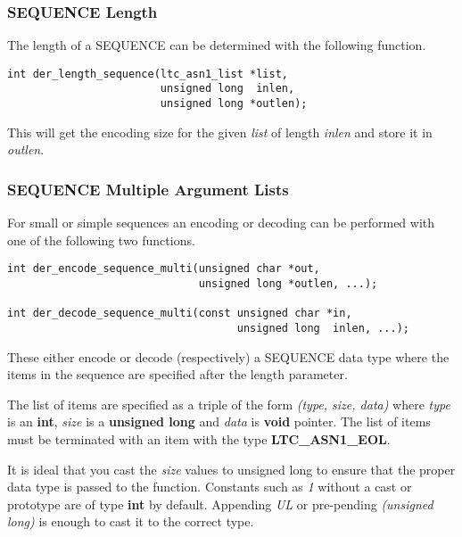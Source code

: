 \documentclass[synpaper]{book}
\begin{document}
\subsubsection{SEQUENCE Length}

The length of a SEQUENCE can be determined with the following function.

\begin{verbatim}
int der_length_sequence(ltc_asn1_list *list,
                        unsigned long  inlen,
                        unsigned long *outlen);
\end{verbatim}

This will get the encoding size for the given \textit{list} of length \textit{inlen} and store it in \textit{outlen}.

\subsubsection{SEQUENCE Multiple Argument Lists}

For small or simple sequences an encoding or decoding can be performed with one of the following two functions.


\begin{verbatim}
int der_encode_sequence_multi(unsigned char *out,
                              unsigned long *outlen, ...);

int der_decode_sequence_multi(const unsigned char *in,
                                    unsigned long  inlen, ...);
\end{verbatim}

These either encode or decode (respectively) a SEQUENCE data type where the items in the sequence are specified after the length parameter.

The list of items are specified as a triple of the form \textit{(type, size, data)}  where \textit{type} is an \textbf{int}, \textit{size} is a \textbf{unsigned long}
and \textit{data} is \textbf{void} pointer.  The list of items must be terminated with an item with the type \textbf{LTC\_ASN1\_EOL}.

It is ideal that you cast the \textit{size} values to unsigned long to ensure that the proper data type is passed to the function.  Constants such as \textit{1} without
a cast or prototype are of type \textbf{int} by default.  Appending \textit{UL} or pre-pending \textit{(unsigned long)} is enough to cast it to the correct type.
\end{document}
